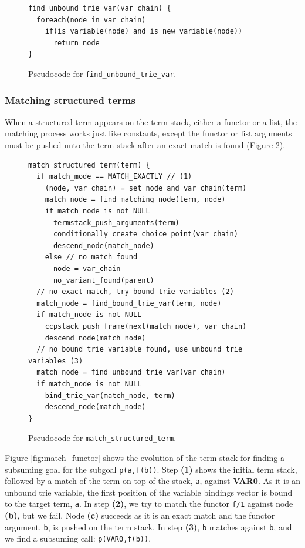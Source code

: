\begin{figure}[ht]
\begin{Verbatim}[fontsize=\small]
find_unbound_trie_var(var_chain) {
  foreach(node in var_chain)
    if(is_variable(node) and is_new_variable(node))
      return node
}
\end{Verbatim}
\caption{Pseudo\-code for \texttt{find\_unbound\_trie\_var}.}
\label{fig:find_unbound_trie_var}
\end{figure}

\subsubsection{Matching structured terms}

When a structured term appears on the term stack, either a functor or a list, the matching process works
just like constants, except the functor or list arguments must be pushed unto the term stack after an exact
match is found (Figure \ref{fig:match_structured_term}).

\begin{figure}[ht]
\begin{Verbatim}[fontsize=\small]
match_structured_term(term) {
  if match_mode == MATCH_EXACTLY // (1)
    (node, var_chain) = set_node_and_var_chain(term)
    match_node = find_matching_node(term, node)
    if match_node is not NULL
      termstack_push_arguments(term)
      conditionally_create_choice_point(var_chain)
      descend_node(match_node)
    else // no match found
      node = var_chain
      no_variant_found(parent)
  // no exact match, try bound trie variables (2)
  match_node = find_bound_trie_var(term, node)
  if match_node is not NULL
    ccpstack_push_frame(next(match_node), var_chain)
    descend_node(match_node)
  // no bound trie variable found, use unbound trie variables (3)
  match_node = find_unbound_trie_var(var_chain)
  if match_node is not NULL
    bind_trie_var(match_node, term)
    descend_node(match_node)
}
\end{Verbatim}
\caption{Pseudo\-code for \texttt{match\_structured\_term}.}
\label{fig:match_structured_term}
\end{figure}

Figure \ref{fig:match_functor} shows the evolution of the term stack for finding
a subsuming goal for the subgoal \texttt{p(a,f(b))}. Step \textbf{(1)} shows the initial 
term stack, followed by a match of the term on top of the stack, \texttt{a}, against \textbf{VAR0}.
As it is an unbound trie variable, the first position of the variable bindings vector is
bound to the target term, \texttt{a}.
In step \textbf{(2)}, we try to match the functor \texttt{f/1} against node \textbf{(b)}, but we fail.
Node \textbf{(c)} succeeds as it is an exact match and the functor argument, \texttt{b}, is pushed on
the term stack. In step \textbf{(3)}, \texttt{b} matches against \texttt{b}, and we find a subsuming call:
\texttt{p(VAR0,f(b))}.

